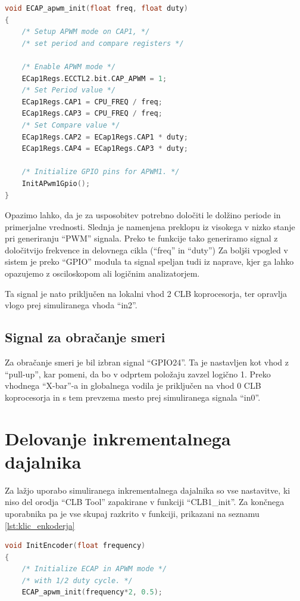 \documentclass[a4paper]{article}
\begin{document}
\begin{sloppypar}
\filbreak
\begin{lstlisting}[language=C,
                   caption={Implementacija funkcije za usposobitev ``eCAP'' 
                            modula v ``apwm'' načinu},
                   label={lst:ecap_init}]
void ECAP_apwm_init(float freq, float duty)
{
    /* Setup APWM mode on CAP1, */
    /* set period and compare registers */

    /* Enable APWM mode */
    ECap1Regs.ECCTL2.bit.CAP_APWM = 1;
    /* Set Period value */
    ECap1Regs.CAP1 = CPU_FREQ / freq;
    ECap1Regs.CAP3 = CPU_FREQ / freq;
    /* Set Compare value */
    ECap1Regs.CAP2 = ECap1Regs.CAP1 * duty;
    ECap1Regs.CAP4 = ECap1Regs.CAP3 * duty;

    /* Initialize GPIO pins for APWM1. */
    InitAPwm1Gpio();
}
\end{lstlisting}

Opazimo lahko, da je za usposobitev potrebno določiti le dolžino periode in
primerjalne vrednosti. Slednja je namenjena preklopu iz visokega v nizko stanje
pri generiranju ``PWM'' signala. Preko te funkcije tako generiramo signal z
določitvijo frekvence in delovnega cikla (``freq'' in ``duty'') Za boljši
vpogled v sistem je preko ``GPIO'' modula ta signal speljan tudi iz naprave,
kjer ga lahko opazujemo z osciloskopom ali logičnim analizatorjem.

Ta signal je nato priključen na lokalni vhod 2 CLB koprocesorja, ter opravlja
vlogo prej simuliranega vhoda ``in2''.

\subsection{Signal za obračanje smeri}
Za obračanje smeri je bil izbran signal ``GPIO24''. Ta je nastavljen kot vhod z
``pull-up'', kar pomeni, da bo v odprtem položaju zavzel logično 1. Preko
vhodnega ``X-bar''-a in globalnega vodila je priključen na vhod 0 CLB
koprocesorja in s tem prevzema mesto prej simuliranega signala ``in0''.

\section{Delovanje inkrementalnega dajalnika}
Za lažjo uporabo simuliranega inkrementalnega dajalnika so vse nastavitve, ki
niso del orodja ``CLB Tool'' zapakirane v funkciji ``CLB1\_init''. Za končnega
uporabnika pa je vse skupaj razkrito v funkciji, prikazani na seznamu
\ref{lst:klic_enkoderja}

\begin{lstlisting}[language=C,
                   caption={Implementacija funkcije za nastavitev 
                            inkrementalnega dajalnika},
                   label={lst:klic_enkoderja}]
void InitEncoder(float frequency)
{
    /* Initialize ECAP in APWM mode */
    /* with 1/2 duty cycle. */
    ECAP_apwm_init(frequency*2, 0.5);


\end{lstlisting}
\end{sloppypar}
\end{document}

